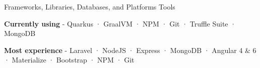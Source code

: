 \begin{cventries}
{\begin{cvitems}
      \end{cvitems}
    }
  \cventry
    {Frameworks, Libraries, Databases, and Platforms} %
    {Tools} %
    {} %
    {} %
    {
      \begin{cvitems} %
        \item {\textbf{Currently using} \hspace{0.03cm} - \hspace{0.03cm} Quarkus \hspace{0.03cm} · \hspace{0.03cm} GraalVM \hspace{0.03cm} · \hspace{0.03cm} NPM \hspace{0.03cm} · \hspace{0.03cm} Git \hspace{0.03cm} · \hspace{0.03cm} Truffle Suite \hspace{0.03cm} · \hspace{0.03cm} MongoDB} %
        \item {\textbf{Most experience} \hspace{0.03cm} - \hspace{0.03cm} Laravel \hspace{0.03cm} · \hspace{0.03cm} NodeJS \hspace{0.03cm} · \hspace{0.03cm} Express \hspace{0.03cm} · \hspace{0.03cm} MongoDB \hspace{0.03cm} · \hspace{0.03cm} Angular 4 \& 6 \hspace{0.03cm} · \hspace{0.03cm} Materialize \hspace{0.03cm} · \hspace{0.03cm} Bootstrap \hspace{0.03cm} · \hspace{0.03cm} NPM \hspace{0.03cm} · \hspace{0.03cm} Git} %

\end{cvitems}}
\end{cventries}

